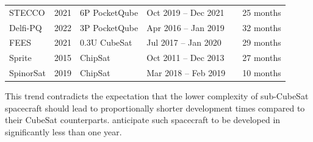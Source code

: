 \documentclass[journal,10pt]{IEEEtran}
\begin{document}
\begin{table}[h]
\begin{tabular}{llll@{\hskip 0.5em}ll}
		STECCO & 2021 & 6P PocketQube & Oct 2019 -- Dec 2021 & \autocite{sapienzauniversitadiromaSapienzaSkyStecco2021} & 25 months \\
		Delfi-PQ & 2022 & 3P PocketQube & Apr 2016 -- Jan 2019 & \autocite{raduDelfiPQFirstPocketqube2018} & 32 months \\
		FEES & 2021 & 0.3U CubeSat & Jul 2017 -- Jan 2020 & \autocite{surelCubeSatInorbitTechnology2019} & 29 months \\
		Sprite & 2015 & ChipSat & Oct 2011 -- Dec 2013 & \autocite{manchesterKickSatYourPersonal2016} & 27 months \\
		SpinorSat & 2019 & ChipSat & Mar 2018 -- Feb 2019 & \autocite{brashearsSpinorSatStep502018} & 10 months \\ \hline
		\end{tabular}
	\end{table}
	
	This trend contradicts the expectation that the lower complexity of sub-CubeSat spacecraft should lead to proportionally shorter development times compared to their CubeSat counterparts. \citeauthor{heinAttoSatsChipSatsOther2019} \autocite{heinAttoSatsChipSatsOther2019} anticipate such spacecraft to be developed in significantly less than one year.
\end{document}
